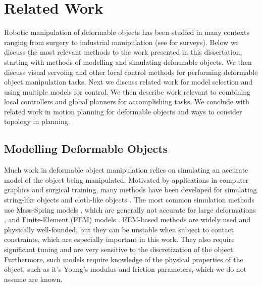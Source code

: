 \chapter{Related Work}

Robotic manipulation of deformable objects has been studied in many contexts ranging from surgery to industrial manipulation (see \cite{Khalil2010, Jimenez2012, Sanchez2018deformablesurvey} for surveys). Below we discuss the most relevant methods to the work presented in this dissertation, starting with methods of modelling and simulating deformable objects. We then discuss visual servoing and other local control methods for performing deformable object manipulation tasks. Next we discuss related work for model selection and using multiple models for control. We then describe work relevant to combining local controllers and global planners for accomplishing tasks. We conclude with related work in motion planning for deformable objects and ways to consider topology in planning.


\section{Modelling Deformable Objects}

Much work in deformable object manipulation relies on simulating an accurate model of the object being manipulated. Motivated by applications in computer graphics and surgical training, many methods have been developed for simulating string-like objects \cite{Bergou2008, Rungjiratananon2011} and cloth-like objects \cite{Baraff1998, Goldenthal2007}. The most common simulation methods use Mass-Spring models \cite{Gibson1997, Essahbi2012}, which are generally not accurate for large deformations \cite{Maris2010}, and Finite-Element (FEM) models \cite{Muller2002, Irving2004, Kaufmann2008}. FEM-based methods are widely used and physically well-founded, but they can be unstable when subject to contact constraints, which are especially important in this work. They also require significant tuning and are very sensitive to the discretization of the object. Furthermore, such models require knowledge of the physical properties of the object, such as it's Young's modulus and friction parameters, which we do not assume are known.

